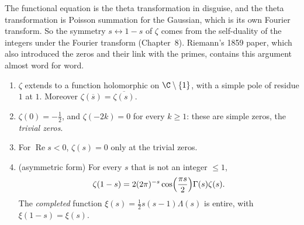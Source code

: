 \begin{beauty}
The functional equation is the theta transformation in disguise, and the theta transformation is Poisson summation for
the Gaussian, which is its own Fourier transform. So the symmetry $s\leftrightarrow1-s$ of $\zeta$ comes from the self-duality of the
integers under the Fourier transform (Chapter~8). Riemann's 1859 paper, which also introduced the zeros and their link
with the primes, contains this argument almost word for word.
\end{beauty}

\begin{corollary}\label{cor:zetaplane}
\begin{enumerate}[label=(\alph*)]
\item $\zeta$ extends to a function holomorphic on $\C\setminus\{1\}$, with a simple pole of residue $1$ at $1$. Moreover $\zeta(\overline s)=\overline{\zeta(s)}$.
\item $\zeta(0)=-\frac12$, and $\zeta(-2k)=0$ for every $k\ge1$: these are simple zeros, the \emph{trivial zeros}.
\item For $\operatorname{Re}s<0$, $\zeta(s)=0$ only at the trivial zeros.
\item (asymmetric form) For every $s$ that is not an integer $\le1$,
\[
\zeta(1-s)=2(2\pi)^{-s}\cos\Bigl(\frac{\pi s}2\Bigr)\Gamma(s)\zeta(s).
\]
The \emph{completed} function $\xi(s)=\frac12s(s-1)\Lambda(s)$ is entire, with $\xi(1-s)=\xi(s)$.
\end{enumerate}
\end{corollary}
